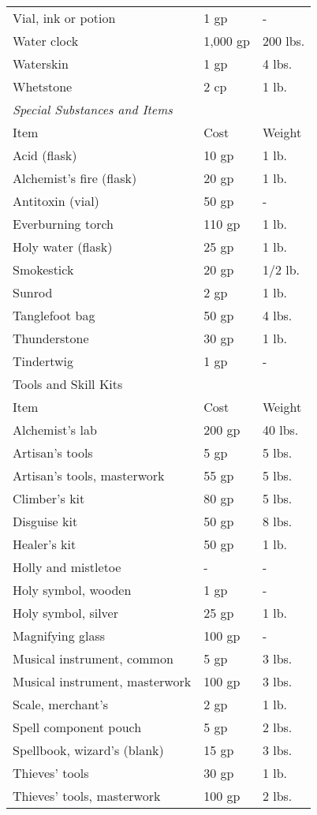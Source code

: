 \begin{table*}[]
\begin{tabular}{lll}
 Vial, ink or potion & 1 gp & - \\
 Water clock & 1,000 gp & 200 lbs. \\
 Waterskin & 1 gp & 4 lbs. \\
 Whetstone & 2 cp & 1 lb.\\
\textit{Special Substances and Items} \\
Item & Cost & Weight\\
Acid (flask) & 10 gp & 1 lb. \\
 Alchemist's fire (flask) & 20 gp & 1 lb. \\
 Antitoxin (vial) & 50 gp & - \\
 Everburning torch & 110 gp & 1 lb. \\
 Holy water (flask) & 25 gp & 1 lb. \\
 Smokestick & 20 gp & 1/2 lb. \\
 Sunrod & 2 gp & 1 lb. \\
 Tanglefoot bag & 50 gp & 4 lbs. \\
 Thunderstone & 30 gp & 1 lb. \\
 Tindertwig & 1 gp & -\\
Tools and Skill Kits  \\
 Item & Cost & Weight\\
Alchemist's lab & 200 gp & 40 lbs. \\
 Artisan's tools & 5 gp & 5 lbs. \\
 Artisan's tools, masterwork & 55 gp & 5 lbs. \\
 Climber's kit & 80 gp & 5 lbs. \\
 Disguise kit & 50 gp & 8 lbs. \\
 Healer's kit & 50 gp & 1 lb. \\
 Holly and mistletoe & - & - \\
 Holy symbol, wooden & 1 gp & - \\
 Holy symbol, silver & 25 gp & 1 lb. \\
 Magnifying glass & 100 gp & - \\
 Musical instrument, common & 5 gp & 3 lbs. \\
 Musical instrument, masterwork & 100 gp & 3 lbs. \\
 Scale, merchant's & 2 gp & 1 lb. \\
 Spell component pouch & 5 gp & 2 lbs. \\
 Spellbook, wizard's (blank) & 15 gp & 3 lbs. \\
 Thieves' tools & 30 gp & 1 lb. \\
 Thieves' tools, masterwork & 100 gp & 2 lbs. \\

\end{tabular}
\end{table*}
